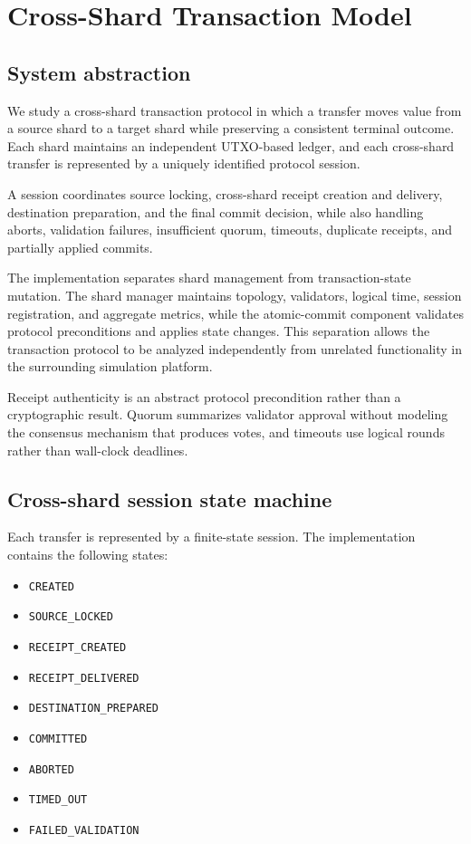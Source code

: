 \section{Cross-Shard Transaction Model}
\label{sec:cross-shard-model}

\subsection{System abstraction}
\label{subsec:system-abstraction}

We study a cross-shard transaction protocol in which a transfer moves value from
a source shard to a target shard while preserving a consistent terminal outcome.
Each shard maintains an independent UTXO-based ledger, and each cross-shard
transfer is represented by a uniquely identified protocol session.

A session coordinates source locking, cross-shard receipt creation and delivery,
destination preparation, and the final commit decision, while also handling
aborts, validation failures, insufficient quorum, timeouts, duplicate receipts,
and partially applied commits.

The implementation separates shard management from transaction-state mutation.
The shard manager maintains topology, validators, logical time, session
registration, and aggregate metrics, while the atomic-commit component validates
protocol preconditions and applies state changes. This separation allows the
transaction protocol to be analyzed independently from unrelated functionality
in the surrounding simulation platform.

Receipt authenticity is an abstract protocol precondition rather than a
cryptographic result. Quorum summarizes validator approval without modeling the
consensus mechanism that produces votes, and timeouts use logical rounds rather
than wall-clock deadlines.

\subsection{Cross-shard session state machine}
\label{subsec:state-machine}

Each transfer is represented by a finite-state session. The implementation
contains the following states:

\begin{itemize}
\item \texttt{CREATED}
\item \texttt{SOURCE\_\allowbreak LOCKED}
\item \texttt{RECEIPT\_\allowbreak CREATED}
\item \texttt{RECEIPT\_\allowbreak DELIVERED}
\item \texttt{DESTINATION\_\allowbreak PREPARED}
\item \texttt{COMMITTED}
\item \texttt{ABORTED}
\item \texttt{TIMED\_\allowbreak OUT}
\item \texttt{FAILED\_\allowbreak VALIDATION}
\end{itemize}

